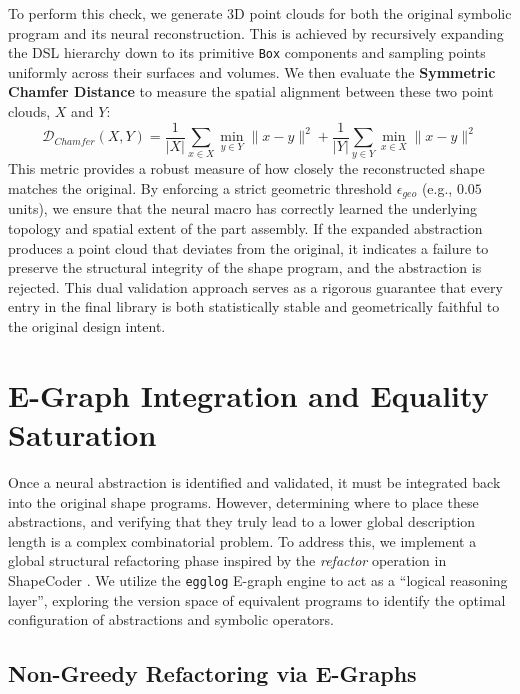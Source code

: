 \documentclass{thesis}
\begin{document}
To perform this check, we generate 3D point clouds for both the original symbolic program and its neural reconstruction. This is achieved by recursively expanding the DSL hierarchy down to its primitive \texttt{Box} components and sampling points uniformly across their surfaces and volumes. We then evaluate the \textbf{Symmetric Chamfer Distance} to measure the spatial alignment between these two point clouds, $X$ and $Y$:
\begin{equation}
    \mathcal{D}_{Chamfer}(X, Y) = \frac{1}{|X|} \sum_{x \in X} \min_{y \in Y} \|x - y\|^2 + \frac{1}{|Y|} \sum_{y \in Y} \min_{x \in X} \|x - y\|^2
\end{equation}
This metric provides a robust measure of how closely the reconstructed shape matches the original. By enforcing a strict geometric threshold $\epsilon_{geo}$ (e.g., $0.05$ units), we ensure that the neural macro has correctly learned the underlying topology and spatial extent of the part assembly. If the expanded abstraction produces a point cloud that deviates from the original, it indicates a failure to preserve the structural integrity of the shape program, and the abstraction is rejected. This dual validation approach serves as a rigorous guarantee that every entry in the final library is both statistically stable and geometrically faithful to the original design intent.


\section{E-Graph Integration and Equality Saturation}

Once a neural abstraction is identified and validated, it must be integrated back into the original shape programs. However, determining where to place these abstractions, and verifying that they truly lead to a lower global description length is a complex combinatorial problem. To address this, we implement a global structural refactoring phase inspired by the \textit{refactor} operation in ShapeCoder \cite{ShapeCoder}. We utilize the \texttt{egglog} E-graph engine \cite{Willsey2021} to act as a ``logical reasoning layer'', exploring the version space of equivalent programs to identify the optimal configuration of abstractions and symbolic operators.

\subsection{Non-Greedy Refactoring via E-Graphs}
\end{document}
